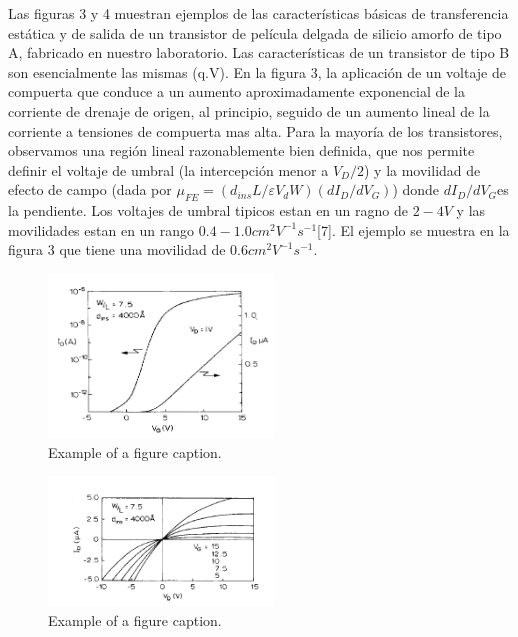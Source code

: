 \documentclass[conference]{IEEEtran}
\begin{document}
    Las figuras 3 y 4 muestran ejemplos de las características básicas de 
    transferencia estática y de salida de un transistor de película delgada de silicio 
    amorfo de tipo A, fabricado en nuestro laboratorio. Las características
    de un transistor de tipo B son esencialmente las mismas (q.V). En la figura 3, 
    la aplicación de un voltaje de compuerta que conduce a un aumento aproximadamente 
    exponencial de la corriente de drenaje de origen, al principio, seguido de un 
    aumento lineal de la corriente a tensiones de compuerta mas alta. Para la mayoría 
    de los transistores, observamos una región lineal razonablemente bien definida, 
    que nos permite definir el voltaje de umbral (la intercepción menor a $V_D/2$) 
    y la movilidad de efecto de campo (dada por $\mu_{FE}=(d_{ins}L/ \varepsilon V_d W)(dI_D/dV_G)$)
    donde $dI_D/dV_G$es la pendiente. Los voltajes de umbral tipicos estan en un ragno de $2-4V$
    y las movilidades estan en un rango $0.4- 1.0 cm^2V^{-1}s^{-1}$[7]. El ejemplo se muestra en la figura 3 que 
    tiene una movilidad de $0.6 cm^2V^{-1}s^{-1}$.

\begin{figure}[htbp]
    \centerline{\includegraphics[width=6.0cm]{img/imagen-3.png}}
    \caption{Example of a figure caption.}%
    \label{fig3}
\end{figure} 


\begin{figure}[htbp]
    \centerline{\includegraphics[width=6.0cm]{img/imagen-4.png}}
    \caption{Example of a figure caption.}%
    \label{fig4}
\end{figure} 
\end{document}
